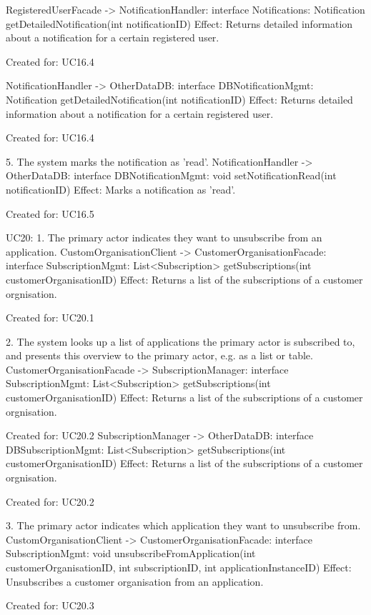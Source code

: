 {{{{{{{{{{{{{{            RegisteredUserFacade -> NotificationHandler: interface Notifications: Notification getDetailedNotification(int notificationID)
                Effect: Returns detailed information about a notification for a certain registered user.
                \item Created for: UC16.4

            NotificationHandler -> OtherDataDB: interface DBNotificationMgmt: Notification getDetailedNotification(int notificationID)
                Effect: Returns detailed information about a notification for a certain registered user.
                \item Created for: UC16.4


        5. The system marks the notification as 'read'.
            NotificationHandler -> OtherDataDB: interface DBNotificationMgmt: void setNotificationRead(int notificationID)
                Effect: Marks a notification as 'read'.
                \item Created for: UC16.5


    UC20:
        1. The primary actor indicates they want to unsubscribe from an application.
            CustomOrganisationClient -> CustomerOrganisationFacade: interface SubscriptionMgmt: List<Subscription> getSubscriptions(int customerOrganisationID)
                Effect: Returns a list of the subscriptions of a customer orgnisation.
                \item Created for: UC20.1

        2. The system looks up a list of applications the primary actor is subscribed to, and presents this overview to the primary actor, e.g. as a list or table.
            CustomerOrganisationFacade -> SubscriptionManager: interface SubscriptionMgmt: List<Subscription> getSubscriptions(int customerOrganisationID)
                Effect: Returns a list of the subscriptions of a customer orgnisation.
                \item Created for: UC20.2
            SubscriptionManager -> OtherDataDB: interface DBSubscriptionMgmt: List<Subscription> getSubscriptions(int customerOrganisationID)
                Effect: Returns a list of the subscriptions of a customer orgnisation.
                \item Created for: UC20.2

        3. The primary actor indicates which application they want to unsubscribe from.
            CustomOrganisationClient -> CustomerOrganisationFacade: interface SubscriptionMgmt: void unsubscribeFromApplication(int customerOrganisationID, int subscriptionID, int applicationInstanceID)
                Effect: Unsubscribes a customer organisation from an application.
                \item Created for: UC20.3

}}}}}}}}}}}}}}

